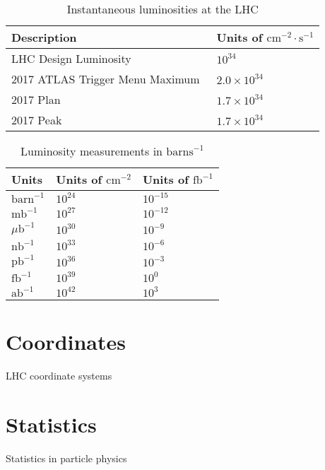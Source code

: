 \begin{table}[htpb]
 \centering
 \caption{Instantaneous luminosities at the LHC}
 \begin{tabular}{@{}ll@{}} \toprule
  Description                                                    & Units of $\textrm{cm}^{-2}\cdot\textrm{s}^{-1}$ \\ \midrule
  LHC Design Luminosity~\cite{Bruning:782076}                    & $10^{34}$                                       \\
  2017 ATLAS Trigger Menu Maximum~\cite{TWiki:MenuEvolution2017} & $2.0 \times 10^{34}$                            \\
  2017 Plan~\cite{Indico:MenuCoordination_2017Lumi}              & $1.7 \times 10^{34}$                            \\
  2017 Peak~\cite{TWiki:2017ATLASPeakLumi}                       & $1.7 \times 10^{34}$                            \\
  \bottomrule
 \end{tabular}\label{table:LHC_Luminosity_Goals}%
\end{table}

\begin{table}[htpb]
 \centering
 \caption{Luminosity measurements in $\text{barns}^{-1}$}
 \begin{tabular}{@{}lll@{}} \toprule
  Units                & Units of $\textrm{cm}^{-2}$ & Units of $\textrm{fb}^{-1}$ \\ \midrule
  $\textrm{barn}^{-1}$ & $10^{24}$                   & $10^{-15}$                  \\
  $\textrm{mb}^{-1}$   & $10^{27}$                   & $10^{-12}$                  \\
  $\mu\textrm{b}^{-1}$ & $10^{30}$                   & $10^{-9}$                   \\
  $\textrm{nb}^{-1}$   & $10^{33}$                   & $10^{-6}$                   \\
  $\textrm{pb}^{-1}$   & $10^{36}$                   & $10^{-3}$                   \\
  $\textrm{fb}^{-1}$   & $10^{39}$                   & $10^{0}$                    \\
  $\textrm{ab}^{-1}$   & $10^{42}$                   & $10^{3}$                    \\
  \bottomrule
 \end{tabular}\label{table:Luminosity}%
\end{table}

\section{Coordinates}\label{section:coordinates}

LHC coordinate systems\\

\section{Statistics}\label{section:statistics}

Statistics in particle physics
